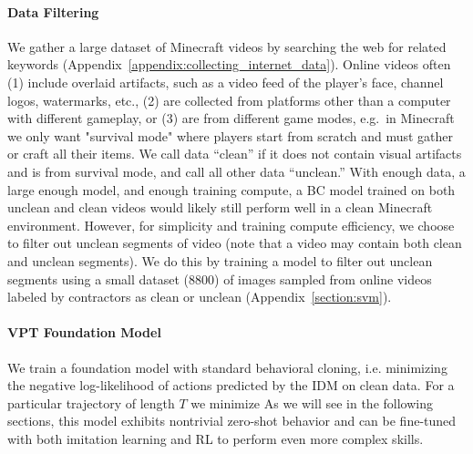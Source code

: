 \paragraph{Data Filtering} We gather a large dataset of Minecraft videos by searching the web for related keywords (Appendix~\ref{appendix:collecting_internet_data}). Online videos often (1) include overlaid artifacts, such as a video feed of the player’s face, channel logos, watermarks, etc., (2) are collected from platforms other than a computer with different gameplay, or (3) are from different game modes, e.g.\ in Minecraft we only want "survival mode" where players start from scratch and must gather or craft all their items.
We call data ``clean'' if it does not contain visual artifacts and is from survival mode, and call all other data ``unclean.'' With enough data, a large enough model, and enough training compute, a BC model trained on both unclean and clean videos would likely still perform well in a clean Minecraft environment. However, for simplicity and training compute efficiency, we choose to filter out unclean segments of video (note that a video may contain both clean and unclean segments). We do this by training a model to filter out unclean segments using a small dataset (8800) of images sampled from online videos labeled by contractors as clean or unclean (Appendix~\ref{section:svm}).


\paragraph{VPT Foundation Model} We train a foundation model with standard behavioral cloning, i.e. minimizing the negative log-likelihood of actions predicted by the IDM on clean data. For a particular trajectory of length $T$ we minimize
As we will see in the following sections, this model exhibits nontrivial zero-shot behavior and can be fine-tuned with both imitation learning and RL to perform even more complex skills. 
